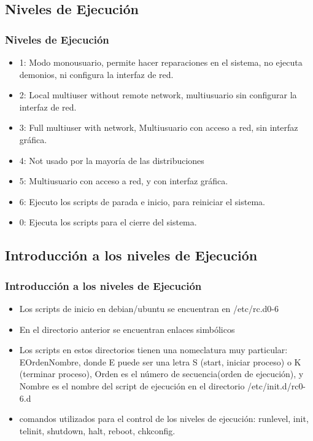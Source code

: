 \documentclass{beamer}
\begin{document}
\subsection{Niveles de Ejecuci\'on}
\begin{frame}
\frametitle{Niveles de Ejecuci\'on}
\begin{itemize}
\item \alert{1}: Modo monousuario, permite hacer reparaciones en el sistema, no ejecuta demonios, ni configura la interfaz de red.
\item \alert{2}: Local multiuser without remote network, multiusuario sin configurar la interfaz de red. 
\item \alert{3}: Full multiuser with network, Multiusuario con acceso a red, sin interfaz gr\'afica.
\item \alert{4}: Not usado por la mayoría de las distribuciones
\item \alert{5}: Multiusuario con acceso a red, y con interfaz gr\'afica.
\item \alert{6}: Ejecuto los scripts de parada e inicio, para reiniciar el sistema.
\item \alert{0}: Ejecuta los scripts para el cierre del sistema.
\end{itemize}
\end{frame}

\subsection{Introducci\'on a los niveles de Ejecuci\'on}
\begin{frame}
\frametitle{Introducci\'on a los niveles de Ejecuci\'on}
\begin{itemize}
\item Los scripts de inicio en debian/ubuntu se encuentran en /etc/rc.d{0-6}
\item En el directorio anterior se encuentran enlaces simb\'olicos
\item Los scripts en estos directorios tienen una nomeclatura muy particular: EOrdenNombre, donde E puede ser una letra S (start, iniciar proceso) o  K (terminar proceso), Orden es el n\'umero de secuencia(orden de ejecuci\'on), y Nombre es el nombre del script de ejecuci\'on en el directorio /etc/init.d/rc{0-6}.d
\item comandos utilizados para el control de los niveles de ejecuci\'on: runlevel, init, telinit, shutdown, halt, reboot, chkconfig.
\end{itemize}
\end{frame}
\end{document}
